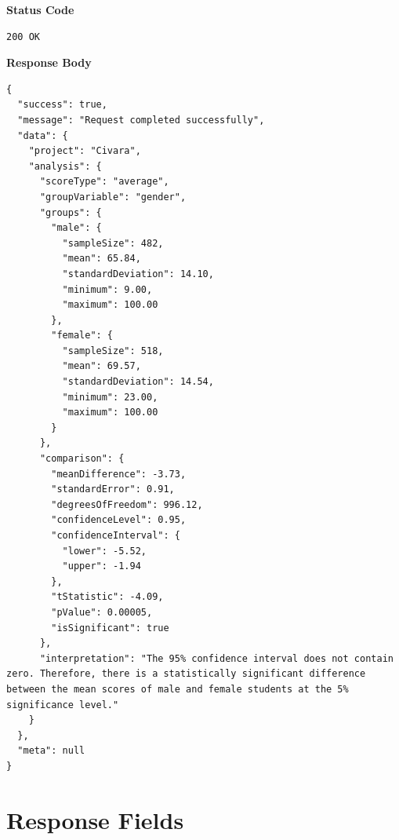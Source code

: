 \documentclass[12pt,a4paper]{article}
\begin{document}
\textbf{Status Code}

\begin{lstlisting}
200 OK
\end{lstlisting}

\textbf{Response Body}

\begin{lstlisting}
{
  "success": true,
  "message": "Request completed successfully",
  "data": {
    "project": "Civara",
    "analysis": {
      "scoreType": "average",
      "groupVariable": "gender",
      "groups": {
        "male": {
          "sampleSize": 482,
          "mean": 65.84,
          "standardDeviation": 14.10,
          "minimum": 9.00,
          "maximum": 100.00
        },
        "female": {
          "sampleSize": 518,
          "mean": 69.57,
          "standardDeviation": 14.54,
          "minimum": 23.00,
          "maximum": 100.00
        }
      },
      "comparison": {
        "meanDifference": -3.73,
        "standardError": 0.91,
        "degreesOfFreedom": 996.12,
        "confidenceLevel": 0.95,
        "confidenceInterval": {
          "lower": -5.52,
          "upper": -1.94
        },
        "tStatistic": -4.09,
        "pValue": 0.00005,
        "isSignificant": true
      },
      "interpretation": "The 95% confidence interval does not contain zero. Therefore, there is a statistically significant difference between the mean scores of male and female students at the 5% significance level."
    }
  },
  "meta": null
}
\end{lstlisting}

\section{Response Fields}
\end{document}
